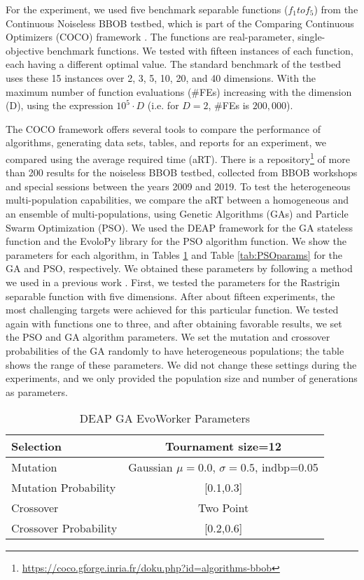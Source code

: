 For the experiment, we used five benchmark separable functions ($f_1 to f_5 $)
from the Continuous Noiseless BBOB testbed, which is part of the Comparing
Continuous Optimizers (COCO) framework \cite{hansen2016coco}. The functions are
real-parameter, single-objective benchmark functions. We tested with fifteen
instances of each function, each having a different optimal value. The standard
benchmark of the testbed uses these 15 instances over 2, 3, 5, 10, 20, and 40
dimensions. With the maximum number of function evaluations (\#FEs) increasing
with the dimension (D), using the expression $10^5 \cdot D$ (i.e. for $D = 2$,
\#FEs is $200,000$).

The COCO framework offers several tools to compare the performance of
algorithms, generating data sets, tables, and reports for an experiment, we
compared using the average required time (aRT). There is a
repository\footnote{\url{https://coco.gforge.inria.fr/doku.php?id=algorithms-bbob}}
of more than 200 results for the noiseless BBOB testbed, collected from BBOB
workshops and special sessions between the years 2009 and 2019. To test the
heterogeneous multi-population capabilities, we compare the aRT between a
homogeneous and an ensemble of multi-populations, using Genetic Algorithms
(GAs) and Particle Swarm Optimization (PSO). We used the DEAP framework for the
GA stateless function \cite{fortin2012deap} and the EvoloPy library
\cite{faris2016evolopy} for the PSO algorithm function. We show the parameters
for each algorithm, in Tables \ref{tab:GAparams} and Table \ref{tab:PSOparams}
for the GA and PSO, respectively. We obtained these parameters by following a
method we used in a previous work \cite{garcia2017benchmarking}. First, we
tested the parameters for the Rastrigin separable function with five
dimensions. After about fifteen experiments, the most challenging targets were
achieved for this particular function. We tested again with functions one to
three, and after obtaining favorable results, we set the PSO and GA algorithm
parameters. We set the mutation and crossover probabilities of the GA randomly
to have heterogeneous populations; the table shows the range of these
parameters. We did not change these settings during the experiments, and we
only provided the population size and number of generations as parameters.

\begin{table}
  \small
  \caption{ DEAP GA EvoWorker Parameters }
  \label{tab:GAparams} 
  \centering
  \small
  \begin{tabular}{|l|c|}
    \hline
    Selection & Tournament size=12                            \\ \hline
    Mutation & Gaussian $\mu=0.0$, $\sigma=0.5$, indbp=0.05   \\ \hline
    Mutation Probability & [0.1,0.3]                          \\ \hline
    Crossover & Two Point                                     \\ \hline
    Crossover Probability  & [0.2,0.6]                          \\ \hline
  \end{tabular}
\end{table}

